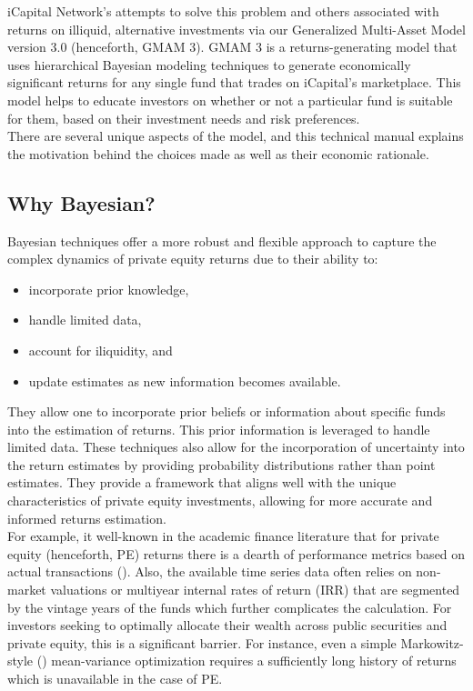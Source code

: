 \documentclass[11pt]{article}
\begin{document}
iCapital Network’s attempts to solve this problem and others associated with returns on illiquid, alternative investments via our Generalized Multi-Asset Model version 3.0 (henceforth, GMAM 3). GMAM 3 is a returns-generating model that uses hierarchical Bayesian modeling techniques to generate economically significant returns for any single fund that trades on iCapital’s marketplace. This model helps to educate investors on whether or not a particular fund is suitable for them, based on their investment needs and risk preferences. \\

There are several unique aspects of the model, and this technical manual explains the motivation behind the choices made as well as their economic rationale.

\subsection{Why Bayesian?}
Bayesian techniques offer a more robust and flexible approach to capture the complex dynamics of private equity returns due to their ability to:
\begin{itemize}
	\item incorporate prior knowledge,
	\item handle limited data,
	\item account for iliquidity, and
	\item update estimates as new information becomes available.
\end{itemize}

They allow one to incorporate prior beliefs or information about specific funds into the estimation of returns. This prior information is leveraged to handle limited data. These techniques also allow for the incorporation of uncertainty into the return estimates by providing probability distributions rather than point estimates. They provide a framework that aligns well with the unique characteristics of private equity investments, allowing for more accurate and informed returns estimation. \\

For example, it well-known in the academic finance literature that for private equity (henceforth, PE) returns there is a dearth of performance metrics based on actual transactions (\cite{Kaplan2005}). Also, the available time series data often relies on non-market valuations or multiyear internal rates of return (IRR) that are segmented by the vintage years of the funds which further complicates the calculation. For investors seeking to optimally allocate their wealth across public securities and private equity, this is a significant barrier. For instance, even a simple Markowitz-style (\cite{markowitz}) mean-variance optimization requires a sufficiently long history of returns which is unavailable in the case of PE. \\
\end{document}
